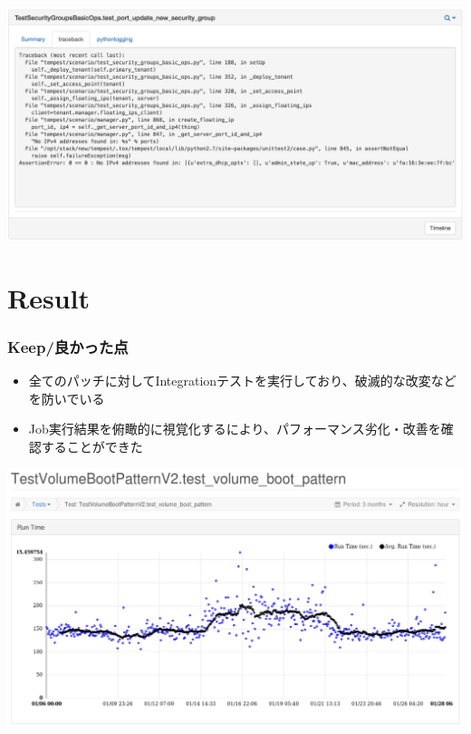 \documentclass[aspectratio=169,11pt,hyperref={colorlinks=true}]{beamer}
\begin{document}
\begin{frame}
  \begin{center}
    \includegraphics[width=1.3\textheight]{stackviz-sample-traceback.png}
  \end{center}
\end{frame}

\section{Result}
\begin{frame}
  \frametitle{Keep/良かった点}
  \begin{itemize}
    \item 全てのパッチに対してIntegrationテストを実行しており、破滅的な改変などを防いでいる
    \item Job実行結果を俯瞰的に視覚化するにより、パフォーマンス劣化・改善を確認することができた
  \end{itemize}
  \begin{center}
    \includegraphics[width=1.1\textheight]{Performance-Issue-o-h.png}
  \end{center}
\end{frame}
\end{document}
